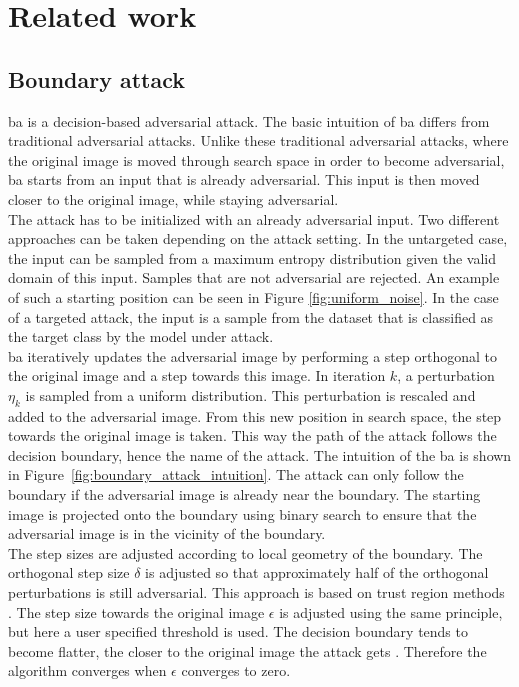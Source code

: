\chapter{Related work}
\section{Boundary attack}
\gls{ba} \cite{boundary_attack} is a decision-based adversarial attack. The basic intuition of \gls{ba} differs from traditional adversarial attacks. Unlike these traditional adversarial attacks, where the original image is moved through search space in order to become adversarial, \gls{ba} starts from an input that is already adversarial. This input is then moved closer to the original image, while staying adversarial.\\

The attack has to be initialized with an already adversarial input. Two different approaches can be taken depending on the attack setting. In the untargeted case, the input can be sampled from a maximum entropy distribution given the valid domain of this input. Samples that are not adversarial are rejected. An example of such a starting position can be seen in Figure \ref{fig:uniform_noise}. In the case of a targeted attack, the input is a sample from the dataset that is classified as the target class by the model under attack.\\

\gls{ba} iteratively updates the adversarial image by performing a step orthogonal to the original image and a step towards this image. In iteration $k$, a perturbation $\eta_k$ is sampled from a uniform distribution. This perturbation is rescaled and added to the adversarial image. From this new position in search space, the step towards the original image is taken. This way the path of the attack follows the decision boundary, hence the name of the attack. The intuition of the \gls{ba} is shown in Figure~\ref{fig:boundary_attack_intuition}. The attack can only follow the boundary if the adversarial image is already near the boundary. The starting image is projected onto the boundary using binary search to ensure that the adversarial image is in the vicinity of the boundary.\\

The step sizes are adjusted according to local geometry of the boundary. The orthogonal step size $\delta$ is adjusted so that approximately half of the orthogonal perturbations is still adversarial. This approach is based on trust region methods \cite{trm}. The step size towards the original image $\epsilon$ is adjusted using the same principle, but here a user specified threshold is used. The decision boundary tends to become flatter, the closer to the original image the attack gets \cite{straight_boundaries}. Therefore the algorithm converges when $\epsilon$ converges to zero.\\

